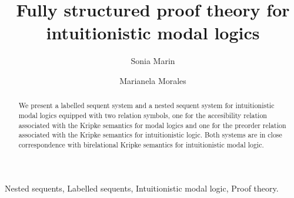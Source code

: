 \documentclass[twoside]{aiml20}
\begin{document}
\begin{frontmatter}
  \title{Fully structured proof theory for intuitionistic modal logics}
  \author{Sonia Marin}
  \address{University College London, UK}
  \author{Marianela Morales}
  \address{LIX, \'Ecole Polytechnique  \&  Inria Saclay, France}
  
  \begin{abstract}
  We present a labelled sequent system and a nested sequent system for intuitionistic modal logics equipped with two relation symbols, one for the accesibility relation associated with the Kripke semantics for modal logics and one for the preorder relation associated with the Kripke semantics for intuitionistic logic. Both systems are in close correspondence with birelational Kripke semantics for intuitionistic modal logic.
  \end{abstract}

  \begin{keyword}
  Nested sequents, Labelled sequents, Intuitionistic modal logic, Proof theory.
  \end{keyword}
 \end{frontmatter}

%
\end{document}
